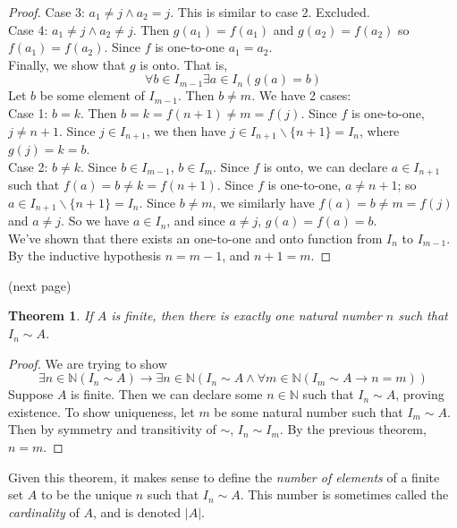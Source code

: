 \documentclass{report}
\newtheorem*{theorem}{Theorem}
\theoremstyle{definition}
\begin{document}
\begin{proof}
\indent Case 3: $a_1\neq j\land a_2=j$. This is similar to case 2. Excluded.\\
\indent Case 4: $a_1\neq j\land a_2\neq j$. Then $g(a_1)=f(a_1)$ and $g(a_2)=f(a_2)$ so $f(a_1)=f(a_2)$. Since $f$ is one-to-one 
$a_1=a_2$.\\
\indent Finally, we show that $g$ is onto. That is,
\begin{equation*}
\forall b\in I_{m-1}\exists a\in I_n(g(a)=b)
\end{equation*}
Let $b$ be some element of $I_{m-1}$. Then $b\neq m$. We have 2 cases:\\
\indent Case 1: $b=k$. Then $b=k=f(n+1)\neq m=f(j)$. Since $f$ is one-to-one, $j\neq n+1$. Since $j\in I_{n+1}$, we then have 
$j\in I_{n+1}\backslash\{n+1\}=I_n$, where $g(j)=k=b$.\\
\indent Case 2: $b\neq k$. Since $b\in I_{m-1}$, $b\in I_m$. Since $f$ is onto, we can declare $a\in I_{n+1}$ such that
$f(a)=b\neq k=f(n+1)$. Since $f$ is one-to-one, $a\neq n+1$; so $a\in I_{n+1}\backslash\{n+1\}=I_n$. Since $b\neq m$, we similarly have
$f(a)=b\neq m=f(j)$ and $a\neq j$. So we have $a\in I_n$, and since $a\neq j$, $g(a)=f(a)=b$.\\
\indent We've shown that there exists an one-to-one and onto function from $I_n$ to $I_{m-1}$. By the inductive hypothesis $n=m-1$,
and $n+1=m$.
\end{proof}
\noindent(next page)\newpage
\begin{theorem}
If $A$ is finite, then there is exactly one natural number $n$ such that $I_n\sim A$.
\end{theorem}
\begin{proof}
We are trying to show
\begin{equation*}
\exists n\in\mathbb N(I_n\sim A)\to\exists n\in\mathbb N(I_n\sim A\land\forall m\in\mathbb N(I_m\sim A\to n=m))
\end{equation*}
Suppose $A$ is finite. Then we can declare some $n\in\mathbb N$ such that $I_n\sim A$, proving existence.
To show uniqueness, let $m$ be some natural number such that $I_m\sim A$. Then by symmetry and transitivity of 
$\sim$, $I_n\sim I_m$. By the previous theorem, $n=m$.
\end{proof}
\noindent Given this theorem, it makes sense to define the \textit{number of elements} of a finite set $A$ to be 
the unique $n$ such that $I_n\sim A$. This number is sometimes called the \textit{cardinality} of $A$, and is
denoted $|A|$.\\
\vspace{1mm}\\
\end{document}
